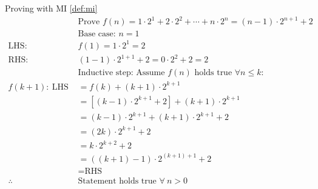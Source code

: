 \begin{example}
    \label{eg:mi_1}
    Proving with MI \ref{def:mi}
    \begin{align*}
                              & \text{Prove } f(n) = 1\cdot2^1 + 2\cdot2^2 + \cdots + n\cdot2^n = (n-1) \cdot 2^{n+1} + 2 \\
                              & \text{Base case: } n = 1                                                                  \\
        \text{LHS:\ }         & f(1) = 1\cdot2^1 = 2                                                                      \\
        \text{RHS:\ }         & (1-1) \cdot 2^{1+1} + 2 = 0 \cdot 2^2 + 2 = 2                                             \\
                              & \text{Inductive step: Assume }f(n)\text{ holds true }\forall n \leq k:                    \\
        f(k+1):\ \text{LHS\ } & = f(k) + (k+1)\cdot2^{k+1}                                                                \\
                              & = [(k-1) \cdot 2^{k+1} + 2] + (k+1)\cdot2^{k+1}                                           \\
                              & = (k-1) \cdot 2^{k+1} + (k+1)\cdot2^{k+1} + 2                                             \\
                              & = (2k) \cdot 2^{k+1} + 2                                                                  \\
                              & = k \cdot 2^{k+2} + 2                                                                     \\
                              & = ((k+1)-1) \cdot 2^{(k+1)+1} + 2                                                         \\
                              & = \text{RHS}                                                                              \\
        \therefore\           & \text{Statement holds true }\forall\ n > 0
    \end{align*}

\end{example}

